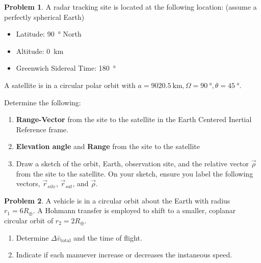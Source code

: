 \documentclass[10pt]{article}
\theoremstyle{definition}
\newtheorem{prob}{Problem}[section]
\newenvironment{subprob}%
{\renewcommand{\theenumi}{\alph{enumi}}\renewcommand{\labelenumi}{(\theenumi)}\begin{enumerate}}%
{\end{enumerate}}%
\newcommand{\extrapage}{\clearpage\newpage\null\newpage}
\begin{document}
\begin{prob}
    A radar tracking site is located at the following location: (assume a perfectly spherical Earth)
    \begin{itemize}
        \item Latitude: \SI{90}{\degree} North
        \item Altitude: \SI{0}{\kilo\meter}
        \item Greenwich Sidereal Time: \SI{180}{\degree}
    \end{itemize}

    A satellite is in a circular polar orbit with \( a = \SI{9020.5}{\kilo\meter}, \Omega = \SI{90}{\degree}, \theta = \SI{45}{\degree}\).

    Determine the following:
    \begin{subprob}
    \item \textbf{Range-Vector} from the site to the satellite in the Earth Centered Inertial Reference frame.
    \item \textbf{Elevation angle} and \textbf{Range} from the site to the satellite
    \item Draw a sketch of the orbit, Earth, observation site, and the relative vector \( \vec \rho \) from the site to the satellite.
        On your sketch, ensure you label the following vectors, \( \vec r_{site} \), \( \vec r_{sat} \), and \( \vec \rho \).
    \end{subprob}
\end{prob}

\extrapage
\extrapage

\begin{prob}
    A vehicle is in a circular orbit about the Earth with radius \( r_1 = 6 R_\oplus\).
    A Hohmann transfer is employed to shift to a smaller, coplanar  circular orbit of \( r_2 = 2 R_\oplus\).
    \begin{subprob}
        \item Determine \( \Delta \bar v_{\text{total}}\) and the time of flight.
        \item Indicate if each manuever increase or decreases the instaneous speed.
    \end{subprob}
\end{prob}

\extrapage
\extrapage
\end{document}
